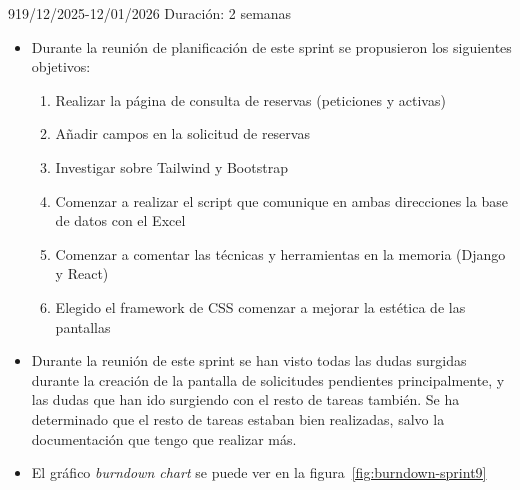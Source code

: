 \begin{Sprint}{9}{19/12/2025-12/01/2026}
	Duración: 2 semanas
	\begin{itemize}	
		\item{}
		Durante la reunión de planificación de este sprint se propusieron los siguientes objetivos:
		\begin{enumerate}
			\item Realizar la página de consulta de reservas (peticiones y activas)
			\item Añadir campos en la solicitud de reservas
			\item Investigar sobre Tailwind y Bootstrap
			\item Comenzar a realizar el script que comunique en ambas direcciones la base de datos con el Excel
			\item Comenzar a comentar las técnicas y herramientas en la memoria (Django y React)
			\item Elegido el framework de CSS comenzar a mejorar la estética de las pantallas
		\end{enumerate}
		\item{}
		Durante la reunión de este sprint se han visto todas las dudas surgidas durante la creación de la pantalla de solicitudes pendientes principalmente, y las dudas que han ido surgiendo con el resto de tareas también. Se ha determinado que el resto de tareas estaban bien realizadas, salvo la documentación que tengo que realizar más.
		
		\item{}
		El gráfico \textit{burndown chart} se puede ver en la figura~\ref{fig:burndown-sprint9}
	\end{itemize}
\end{Sprint}

